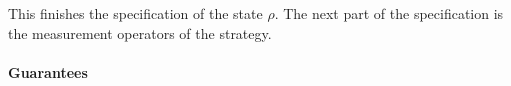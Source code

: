 
This finishes the specification of the state $\rho$. The next part of the specification is the measurement operators of the strategy. 


\paragraph{Guarantees}



